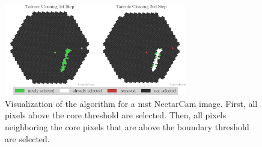 \begin{figure}
    \centering
    \includegraphics[height=4cm]{plots/cleaner_steps/tailcuts.pdf}
    \caption{Visualization of the \tailcuts{} algorithm for a \gls{mst} NectarCam image. First, all
    pixels above the core threshold are selected. Then, all pixels neighboring the core
    pixels that are above the boundary threshold are selected.}%
    \label{fig:tailcuts_clean}
\end{figure}

